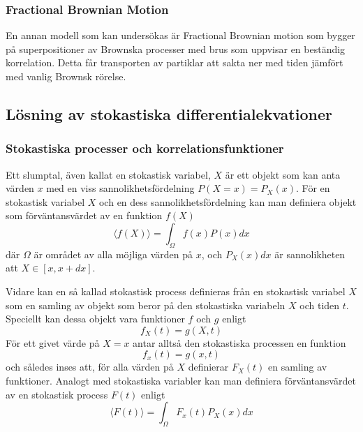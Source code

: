 \subsubsection{Fractional Brownian Motion}

En annan modell som kan undersökas är Fractional Brownian motion som bygger på superpositioner av Brownska processer med brus som uppvisar en beständig korrelation. Detta får transporten av partiklar att sakta ner med tiden jämfört med vanlig Brownsk rörelse. \cite{Hofling_Franosch}


\subsection{Lösning av stokastiska differentialekvationer}
\subsubsection{Stokastiska processer och korrelationsfunktioner}
Ett slumptal, även kallat en stokastisk variabel, $X$ är ett objekt som kan anta värden $x$ med en viss sannolikhetsfördelning $P(X=x)=P_X(x)$. För en stokastisk variabel $X$ och en dess sannolikhetsfördelning kan man definiera objekt som förväntansvärdet av en funktion $f(X)$
\begin{equation}
    \langle f(X) \rangle = \int_{\Omega}f(x)P(x)dx
\end{equation}
där $\Omega$ är området av alla möjliga värden på $x$, och $P_X(x)dx$ är sannolikheten att $X\in[x,x+dx]$. 

Vidare kan en så kallad stokastisk process definieras från en stokastisk variabel $X$ som en samling av objekt som beror på den stokastiska variabeln $X$ och tiden $t$\footnotemark. Speciellt kan dessa objekt vara funktioner $f$ och $g$ enligt 
\begin{equation}
    f_X(t) = g(X,t)
\end{equation}
För ett givet värde på $X=x$ antar alltså den stokastiska processen en funktion
\begin{equation}
    f_x(t) = g(x,t)
\end{equation}
och således inses att, för alla värden på $X$ definierar $F_X(t)$ en samling av funktioner. Analogt med stokastiska variabler kan man definiera förväntansvärdet av en stokastisk process $F(t)$ enligt 
\begin{equation}
    \langle F(t) \rangle = \int_{\Omega} F_x(t)P_X(x)dx
\end{equation}

